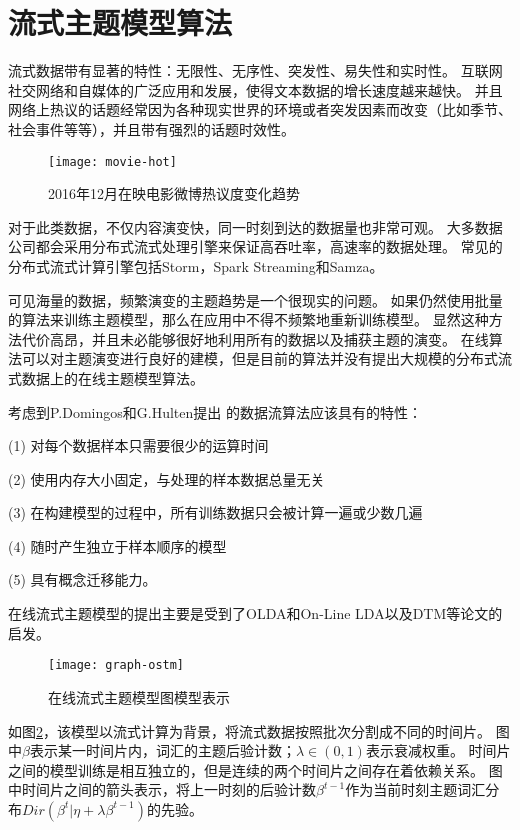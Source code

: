 \section{流式主题模型算法} 
流式数据带有显著的特性：无限性、无序性、突发性、易失性和实时性。
互联网社交网络和自媒体的广泛应用和发展，使得文本数据的增长速度越来越快。
并且网络上热议的话题经常因为各种现实世界的环境或者突发因素而改变（比如季节、社会事件等等），并且带有强烈的话题时效性。
\begin{figure}[htb]\centering
  \texttt{[image: movie-hot]}
  \caption{2016年12月在映电影微博热议度变化趋势}
  \label{fig:LDA}       %
\end{figure}

对于此类数据，不仅内容演变快，同一时刻到达的数据量也非常可观。
大多数据公司都会采用分布式流式处理引擎来保证高吞吐率，高速率的数据处理。
常见的分布式流式计算引擎包括Storm，Spark Streaming和Samza。

可见海量的数据，频繁演变的主题趋势是一个很现实的问题。
如果仍然使用批量的算法来训练主题模型，那么在应用中不得不频繁地重新训练模型。
显然这种方法代价高昂，并且未必能够很好地利用所有的数据以及捕获主题的演变。
在线算法可以对主题演变进行良好的建模，但是目前的算法并没有提出大规模的分布式流式数据上的在线主题模型算法。

考虑到P.Domingos和G.Hulten\cite{Domingos01catchingup}提出
的数据流算法应该具有的特性：

(1) 对每个数据样本只需要很少的运算时间

(2) 使用内存大小固定，与处理的样本数据总量无关

(3) 在构建模型的过程中，所有训练数据只会被计算一遍或少数几遍

(4) 随时产生独立于样本顺序的模型

(5) 具有概念迁移能力。

在线流式主题模型的提出主要是受到了OLDA\cite{hoffman2010online}和On-Line LDA\cite{alsumait2008on-line}以及DTM\cite{blei2006dynamic, wang2012continuous}等论文的启发。

\begin{figure}[htb]\centering
  \texttt{[image: graph-ostm]}
  \caption{在线流式主题模型图模型表示}
  \label{fig:OSTM}       %
\end{figure}

如图\ref{fig:OSTM}，该模型以流式计算为背景，将流式数据按照批次分割成不同的时间片。
图中$\beta$表示某一时间片内，词汇的主题后验计数；$\lambda \in (0, 1)$表示衰减权重。
时间片之间的模型训练是相互独立的，但是连续的两个时间片之间存在着依赖关系。
图中时间片之间的箭头表示，将上一时刻的后验计数$\beta^{t-1}$作为当前时刻主题词汇分布$Dir(\beta^t| \eta + \lambda \beta^{t- 1})$的先验。

